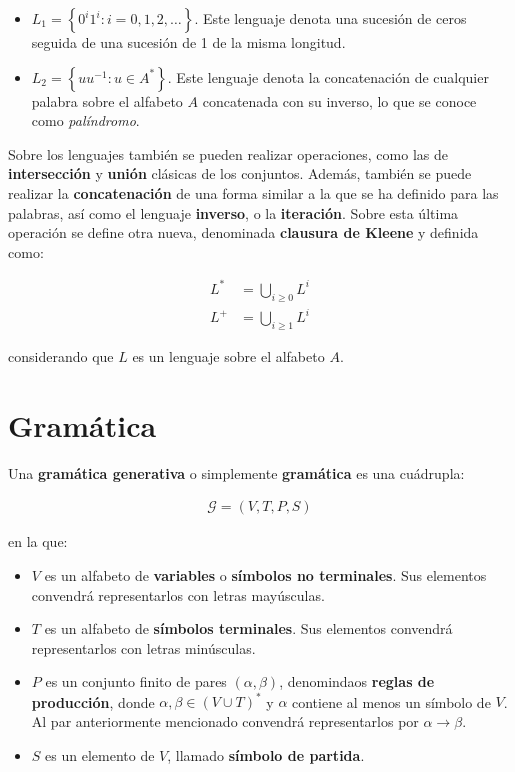 \begin{itemize}
    \item $L_1 = \left\lbrace 0^i 1^i : i = 0,1,2,\ldots \right\rbrace$. Este lenguaje denota una sucesión de ceros seguida de una sucesión de 1 de la misma longitud.

    \item $L_2 = \left\lbrace uu^{-1} : u \in A^* \right\rbrace $. Este lenguaje denota la concatenación de cualquier palabra sobre el alfabeto $A$ concatenada con su inverso, lo que se conoce como \textit{palíndromo}.
\end{itemize}

Sobre los lenguajes también se pueden realizar operaciones, como las de \textbf{intersección} y \textbf{unión} clásicas de los conjuntos. Además, también se puede realizar la \textbf{concatenación} de una forma similar a la que se ha definido para las palabras, así como el lenguaje \textbf{inverso}, o la \textbf{iteración}. Sobre esta última operación se define otra nueva, denominada \textbf{clausura de Kleene} y definida como:

\begin{align*}
    L^* &= \bigcup_{i \geq 0} L^i \\
    L^+ &= \bigcup_{i \geq 1} L^i
\end{align*}

\noindent
considerando que $L$ es un lenguaje sobre el alfabeto $A$.

\section{Gramática}\label{section:gramatica}
\noindent
Una \textbf{gramática generativa} o simplemente \textbf{gramática} es una cuádrupla:

\begin{align*}
    \mathcal{G} = (V,T,P,S)
\end{align*}

\noindent
en la que:

\begin{itemize}
    \item $V$ es un alfabeto de \textbf{variables} o \textbf{símbolos no terminales}. Sus elementos convendrá representarlos con letras mayúsculas.
    \item $T$ es un alfabeto de \textbf{símbolos terminales}. Sus elementos convendrá representarlos con letras minúsculas.
    \item $P$ es un conjunto finito de pares $(\alpha,\beta)$, denomindaos \textbf{reglas de producción}, donde $\alpha,\beta \in (V \cup T)^*$ y $\alpha$ contiene al menos un símbolo de $V$. Al par anteriormente mencionado convendrá representarlos por $\alpha \rightarrow \beta$.
    \item $S$ es un elemento de $V$, llamado \textbf{símbolo de partida}.
\end{itemize}

